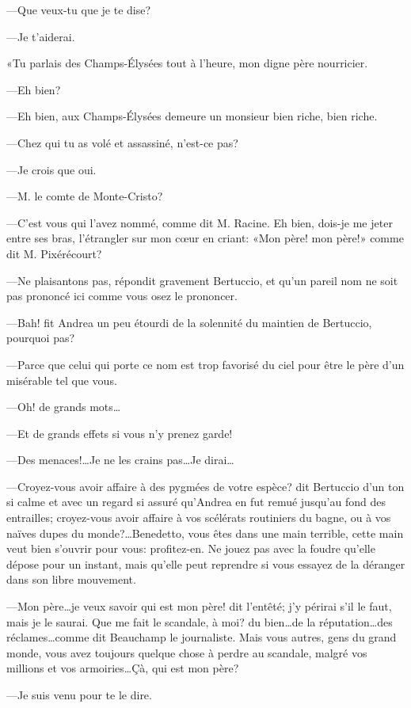 —Que veux-tu que je te dise? 

—Je t'aiderai. 

«Tu parlais des Champs-Élysées tout à l'heure, mon digne père nourricier. 

—Eh bien? 

—Eh bien, aux Champs-Élysées demeure un monsieur bien riche, bien riche. 

—Chez qui tu as volé et assassiné, n'est-ce pas? 

—Je crois que oui. 

—M. le comte de Monte-Cristo? 

—C'est vous qui l'avez nommé, comme dit M. Racine. Eh bien, dois-je me jeter entre ses bras, l'étrangler sur mon cœur en criant: «Mon père! mon père!» comme dit M. Pixérécourt? 

—Ne plaisantons pas, répondit gravement Bertuccio, et qu'un pareil nom ne soit pas prononcé ici comme vous osez le prononcer. 

—Bah! fit Andrea un peu étourdi de la solennité du maintien de Bertuccio, pourquoi pas? 

—Parce que celui qui porte ce nom est trop favorisé du ciel pour être le père d'un misérable tel que vous. 

—Oh! de grands mots\dots 

—Et de grands effets si vous n'y prenez garde! 

—Des menaces!\dots Je ne les crains pas\dots Je dirai\dots 

—Croyez-vous avoir affaire à des pygmées de votre espèce? dit Bertuccio d'un ton si calme et avec un regard si assuré qu'Andrea en fut remué jusqu'au fond des entrailles; croyez-vous avoir affaire à vos scélérats routiniers du bagne, ou à vos naïves dupes du monde?\dots Benedetto, vous êtes dans une main terrible, cette main veut bien s'ouvrir pour vous: profitez-en. Ne jouez pas avec la foudre qu'elle dépose pour un instant, mais qu'elle peut reprendre si vous essayez de la déranger dans son libre mouvement. 

—Mon père\dots je veux savoir qui est mon père! dit l'entêté; j'y périrai s'il le faut, mais je le saurai. Que me fait le scandale, à moi? du bien\dots de la réputation\dots des réclames\dots comme dit Beauchamp le journaliste. Mais vous autres, gens du grand monde, vous avez toujours quelque chose à perdre au scandale, malgré vos millions et vos armoiries\dots Çà, qui est mon père? 

—Je suis venu pour te le dire. 

